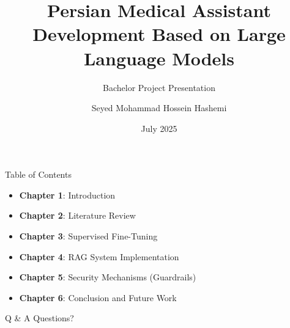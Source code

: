 \documentclass[8pt, aspectratio=54]{beamer}
\title{Persian Medical Assistant Development Based on Large Language Models}
\subtitle{Bachelor Project Presentation}
\author{Seyed Mohammad Hossein Hashemi}
\institute{University of Isfahan – Department of Computer Engineering}
\date{July 2025}
\begin{document}
\maketitle

\begin{frame}{Table of Contents}
    
    \begin{itemize}
    	
    	\item \textbf{Chapter 1}: Introduction
    	
    	\item \textbf{Chapter 2}: Literature Review
    	
    	\item \textbf{Chapter 3}: Supervised Fine-Tuning
    	
    	\item \textbf{Chapter 4}: RAG System Implementation
    	
    	\item \textbf{Chapter 5}: Security Mechanisms (Guardrails)
    	
    	\item \textbf{Chapter 6}: Conclusion and Future Work
    	
    \end{itemize}
    
\end{frame}








\begin{frame}{Q \& A}
    \centering
    \Huge Questions? \\
    \vspace{1cm}
\end{frame}
\end{document}
